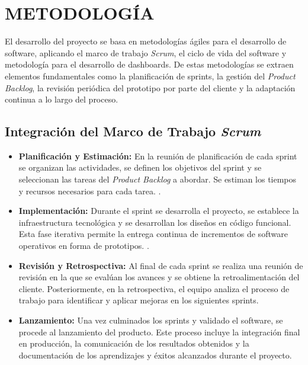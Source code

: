 \documentclass[spanish]{ieee_upb}
\begin{document}


\newpage
\section{METODOLOGÍA}
El desarrollo del proyecto se basa en metodologías ágiles para el desarrollo de software, aplicando el marco de trabajo \textit{Scrum}, el ciclo de vida del software y metodología para el desarrollo de dashboards. De estas metodologías se extraen elementos fundamentales como la planificación de sprints, la gestión del \textit{Product Backlog}, la revisión periódica del prototipo por parte del cliente y la adaptación 
continua a lo largo del proceso.
\subsection{Integración del Marco de Trabajo \textit{Scrum}}

\begin{itemize}
 \item \textbf{Planificación y Estimación:} En la reunión de planificación de cada 
 sprint se organizan las actividades, 
 se definen los objetivos del sprint y 
 se seleccionan las tareas del \textit{Product Backlog} a abordar.
  Se estiman los tiempos y recursos necesarios para cada tarea. \cite{Schwaber2004,Cohn2005}.

 \item \textbf{Implementación:} Durante el sprint se desarrolla el proyecto, 
 se establece la infraestructura tecnológica y se desarrollan los diseños en 
 código funcional. Esta fase iterativa permite la entrega continua de incrementos 
 de software operativos en forma de prototipos. \cite{Sutherland2014}.
 
 \item \textbf{Revisión y Retrospectiva:} Al final de cada sprint se realiza
  una reunión de revisión en la que se evalúan los avances y 
  se obtiene la retroalimentación del cliente. 
  Posteriormente, en la retrospectiva, el equipo analiza el proceso de trabajo 
  para identificar y aplicar mejoras en los siguientes sprints.

 \item \textbf{Lanzamiento:} Una vez culminados los sprints y validado el software, 
 se procede al lanzamiento del producto. Este proceso incluye la integración final 
 en producción, la comunicación de los resultados obtenidos y la documentación de 
 los aprendizajes y éxitos alcanzados durante el proyecto.
\end{itemize}
\end{document}
